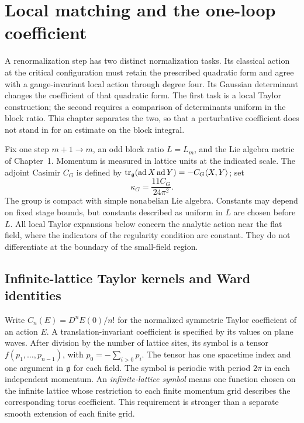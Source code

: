 \chapter[Local matching and the one-loop coefficient]{Local matching and the one-loop coefficient}\label{ch07:matching}

A renormalization step has two distinct normalization tasks. Its
classical action at the critical configuration must retain the prescribed quadratic form
and agree with a gauge-invariant local action through degree four.
Its Gaussian determinant changes the coefficient of that quadratic
form. The first task is a local Taylor construction; the second requires
a comparison of determinants uniform in the block ratio. This chapter
separates the two, so that a perturbative coefficient does not stand in
for an estimate on the block integral.

Fix one step $m+1\to m$, an odd block ratio $L=L_m$, and the Lie
algebra metric of Chapter~1. Momentum is measured in lattice units at
the indicated scale. The adjoint Casimir $C_G$ is defined by
$\operatorname{tr}_{\mathfrak g}(\operatorname{ad}X\operatorname{ad}Y)
=-C_G\langle X,Y\rangle$; set
\[
 \kappa_G=\frac{11C_G}{24\pi^2}.
\]
The group is compact with simple nonabelian Lie algebra. Constants may
depend on fixed stage bounds, but constants described as uniform in $L$
are chosen before $L$. All local Taylor expansions below concern the
analytic action near the flat field, where the indicators of the regularity condition are
constant. They do not differentiate at the boundary of the small-field region.

\section{Infinite-lattice Taylor kernels and Ward identities}\label{ch07:kernels}

Write $C_n(E)=D^nE(0)/n!$ for the normalized symmetric Taylor
coefficient of an action $E$. A translation-invariant coefficient is
specified by its values on plane waves. After division by the number
of lattice sites, its symbol is a tensor
$f(p_1,\ldots,p_{n-1})$, with $p_0=-\sum_{i>0}p_i$.
The tensor has one spacetime index and one argument in $\mathfrak g$ for each field.
The symbol is periodic with period $2\pi$ in each independent momentum.
An \emph{infinite-lattice symbol} means one function chosen on the infinite lattice whose
restriction to each finite momentum grid describes the corresponding
torus coefficient. This requirement is stronger than a separate smooth
extension of each finite grid.

